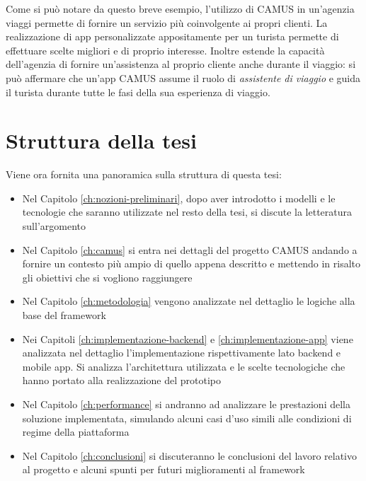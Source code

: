 Come si può notare da questo breve esempio, l'utilizzo di CAMUS in un'agenzia viaggi permette di fornire un servizio più coinvolgente ai propri clienti. La realizzazione di app personalizzate appositamente per un turista permette di effettuare scelte migliori e di proprio interesse. Inoltre estende la capacità dell'agenzia di fornire un'assistenza al proprio cliente anche durante il viaggio: si può affermare che un'app CAMUS assume il ruolo di \emph{assistente di viaggio} e guida il turista durante tutte le fasi della sua esperienza di viaggio.

\section{Struttura della tesi}

Viene ora fornita una panoramica sulla struttura di questa tesi:

\begin{itemize}
	\item 
	Nel Capitolo \ref{ch:nozioni-preliminari}, dopo aver introdotto i modelli e le tecnologie che saranno utilizzate nel resto della tesi, si discute la letteratura sull'argomento
	\item 
	Nel Capitolo \ref{ch:camus} si entra nei dettagli del progetto CAMUS andando a fornire un contesto più ampio di quello appena descritto e mettendo in risalto gli obiettivi che si vogliono raggiungere
	\item 
	Nel Capitolo \ref{ch:metodologia} vengono analizzate nel dettaglio le logiche alla base del framework
	\item 
	Nei Capitoli \ref{ch:implementazione-backend} e \ref{ch:implementazione-app} viene analizzata nel dettaglio l'implementazione rispettivamente lato backend e mobile app. Si analizza l'architettura utilizzata e le scelte tecnologiche che hanno portato alla realizzazione del prototipo
	\item 
	Nel Capitolo \ref{ch:performance} si andranno ad analizzare le prestazioni della soluzione implementata, simulando alcuni casi d'uso simili alle condizioni di regime della piattaforma
	\item 
	Nel Capitolo \ref{ch:conclusioni} si discuteranno le conclusioni del lavoro relativo al progetto e alcuni spunti per futuri miglioramenti al framework
\end{itemize}